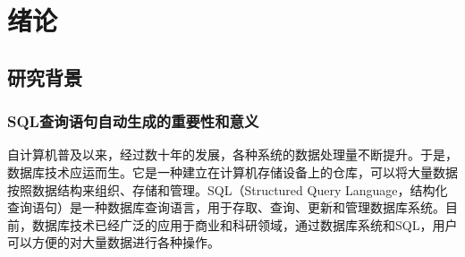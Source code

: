 




\chapter{绪论}
\label{chap:intro}
\section{研究背景}
\label{intro:background}
\subsection{SQL查询语句自动生成的重要性和意义}
\label{intro:dbmssql}
自计算机普及以来，经过数十年的发展，各种系统的数据处理量不断提升。于是，数据库技术应运而生。它是一种建立在计算机存储设备上的仓库，可以将大量数据按照数据结构来组织、存储和管理。SQL（Structured Query Language，结构化查询语句）是一种数据库查询语言，用于存取、查询、更新和管理数据库系统。目前，数据库技术已经广泛的应用于商业和科研领域，通过数据库系统和SQL，用户可以方便的对大量数据进行各种操作。

